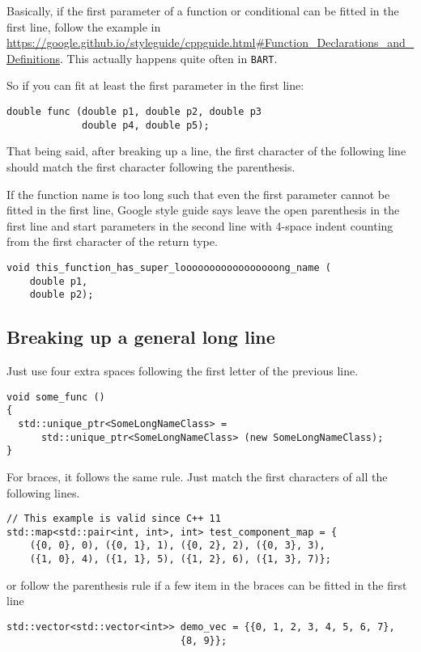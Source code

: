 \documentclass[openany]{book}
\newcommand{\bart}{{\tt BART}}
\begin{document}
Basically, if the first parameter of a function or conditional can be fitted in the first line, follow the example in \url{https://google.github.io/styleguide/cppguide.html#Function_Declarations_and_Definitions}. This actually happens quite often in \bart.

So if you can fit at least the first parameter in the first line:
\begin{lstlisting}
double func (double p1, double p2, double p3
             double p4, double p5);
\end{lstlisting}
That being said, after breaking up a line, the first character of the following line should match the first character following the parenthesis.

If the function name is too long such that even the first parameter cannot be fitted in the first line, Google style guide says leave the open parenthesis in the first line and start parameters in the second line with 4-space indent counting from the first character of the return type.
\begin{lstlisting}
void this_function_has_super_looooooooooooooooong_name (
    double p1,
    double p2);
\end{lstlisting}

\subsection{Breaking up a general long line}
Just use four extra spaces following the first letter of the previous line.
\begin{lstlisting}
void some_func ()
{
  std::unique_ptr<SomeLongNameClass> = 
      std::unique_ptr<SomeLongNameClass> (new SomeLongNameClass);
}
\end{lstlisting}

For braces, it follows the same rule. Just match the first characters of all the following lines.
\begin{lstlisting}
// This example is valid since C++ 11
std::map<std::pair<int, int>, int> test_component_map = {
    ({0, 0}, 0), ({0, 1}, 1), ({0, 2}, 2), ({0, 3}, 3),
    ({1, 0}, 4), ({1, 1}, 5), ({1, 2}, 6), ({1, 3}, 7)};
\end{lstlisting}
or follow the parenthesis rule if a few item in the braces can be fitted in the first line
\begin{lstlisting}
std::vector<std::vector<int>> demo_vec = {{0, 1, 2, 3, 4, 5, 6, 7},
			                  {8, 9}};
\end{lstlisting}
\end{document}
